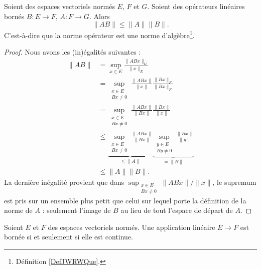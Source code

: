 \begin{lemma}   \label{LEMooFITMooBBBWGI}
	Soient des espaces vectoriels normés \( E\), \( F\) et \( G\). Soient des opérateurs linéaires bornés \( B\colon E\to F\), \( A\colon F\to G\). Alors
	\begin{equation}
		\| AB \|\leq \| A \|\| B \|.
	\end{equation}
	C'est-à-dire que la norme opérateur est une norme d'algèbre\footnote{Définition \ref{DefJWRWQue}.}.
\end{lemma}

\begin{proof}
	Nous avons les (in)égalités suivantes :
	\begin{subequations}
		\begin{align}
			\| AB \| & =\sup_{x\in E}\frac{ \| ABx \|_G }{ \| x \|_E } \\
			         & =\sup_{\substack{x\in E                         \\Bx\neq 0}}\frac{ \| ABx \| }{ \| x \| }\frac{ \| Bx \|_F }{ \| Bx \|_F }\\
			         & =\sup_{\substack{x\in E                         \\Bx\neq 0}}\frac{ \| ABx \| }{ \| Bx \| }\frac{ \| Bx \| }{ \| x \| }\\
			         & \leq\underbrace{\sup_{\substack{x\in E          \\Bx\neq 0}}\frac{ \| ABx \| }{ \| Bx \| }}_{\leq\| A \|}\underbrace{\sup_{\substack{y\in E\\By\neq 0}}\frac{ \| Bx \| }{ \| y \| }}_{=\| B \|}\\
			         & \leq \| A \|\| B \|.
		\end{align}
	\end{subequations}
	La dernière inégalité provient que dans \( \sup_{\substack{x\in E\\Bx\neq 0}}\| ABx \|/\| x \|\), le supremum est pris sur un ensemble plus petit que celui sur lequel porte la définition de la norme de \( A\) : seulement l'image de \( B\) au lieu de tout l'espace de départ de \( A\).
\end{proof}

\begin{proposition}       \label{PROPooQZYVooYJVlBd}
	Soient \( E\) et \( F\) des espaces vectoriels normés. Une application linéaire \( E\to F\) est bornée si et seulement si elle est continue.
\end{proposition}

